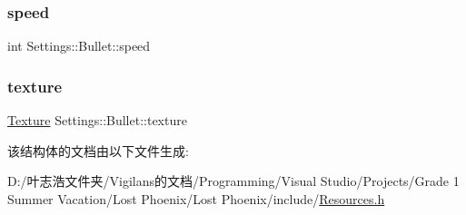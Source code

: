 \mbox{\label{struct_settings_1_1_bullet_a8969e02d4dba2f87284855e0a141f6f3}} 
\subsubsection{\texorpdfstring{speed}{speed}}
{\footnotesize\ttfamily int Settings\+::\+Bullet\+::speed}

\mbox{\label{struct_settings_1_1_bullet_a274a4b14c0bfaa540c5e60c273567bbd}} 
\subsubsection{\texorpdfstring{texture}{texture}}
{\footnotesize\ttfamily \hyperlink{struct_texture}{Texture} Settings\+::\+Bullet\+::texture}



该结构体的文档由以下文件生成\+:\begin{DoxyCompactItemize}
\item 
D\+:/叶志浩文件夹/\+Vigilans的文档/\+Programming/\+Visual Studio/\+Projects/\+Grade 1 Summer Vacation/\+Lost Phoenix/\+Lost Phoenix/include/\hyperlink{_resources_8h}{Resources.\+h}\end{DoxyCompactItemize}
